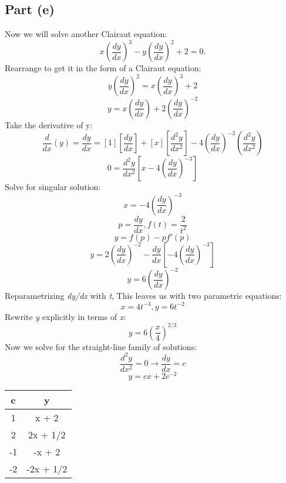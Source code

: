 \documentclass{article}
\begin{document}
\subsection{Part (e)}
Now we will solve another Clairaut equation:
\begin{equation}
x(\frac{dy}{dx})^3 - y(\frac{dy}{dx})^2 + 2 = 0.
\end{equation}
Rearrange to get it in the form of a Clairaut equation:
\begin{equation}
y(\frac{dy}{dx})^2 = x(\frac{dy}{dx})^3 + 2
\end{equation}
\begin{equation}
y = x(\frac{dy}{dx}) + 2(\frac{dy}{dx})^{-2}
\end{equation}
Take the derivative of y:
\begin{equation}
\frac{d}{dx}(y) = \frac{dy}{dx} = [1][\frac{dy}{dx}] + [x][\frac{d^2y}{dx^2}] -4(\frac{dy}{dx})^{-3}(\frac{d^2y}{dx^2})
\end{equation}
\begin{equation}
0 = \frac{d^2y}{dx^2}[x-4(\frac{dy}{dx})^{-3}]
\end{equation}
Solve for singular solution:
\begin{equation}
x = -4(\frac{dy}{dx})^{-3}
\end{equation}
\begin{equation}
p = \frac{dy}{dx}, f(t) = \frac{2}{t^2}
\end{equation}
\begin{equation}
y = f(p) - pf'(p)
\end{equation}
\begin{equation}
y = 2(\frac{dy}{dx})^{-2} - \frac{dy}{dx}[-4(\frac{dy}{dx})^{-3}]
\end{equation}
\begin{equation}
y = 6(\frac{dy}{dx})^{-2}
\end{equation}
Reparametrizing \textit{dy/dx} with \textit{t}, This leaves us with two parametric equations:
\begin{equation}
x = 4t^{-3}, y = 6t^{-2}
\end{equation}
Rewrite \textit{y} explicitly in terms of \textit{x}:
\begin{equation}
y = 6(\frac{x}{4})^{2/3}
\end{equation}
Now we solve for the straight-line family of solutions:
\begin{equation}
\frac{d^2y}{dx^2} = 0 \rightarrow \frac{dy}{dx} = c
\end{equation}
\begin{equation}
y = cx + 2c^{-2}
\end{equation}
\begin{center}
\begin{tabular}{| c | c |}
\hline
c & y \\
\hline
 1 & x + 2  \\
 \hline
 2 & 2x + 1/2 \\
 \hline
 -1 & -x + 2  \\
 \hline
 -2 &  -2x + 1/2 \\
\hline
\end{tabular}
\end{center}
\end{document}
